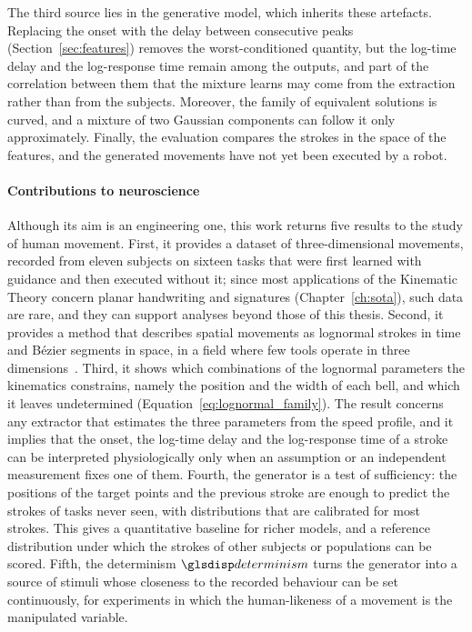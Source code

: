 \documentclass[12pt]{report}
\begin{document}
The third source lies in the generative model, which inherits these artefacts. Replacing the onset with the delay between consecutive peaks (Section~\ref{sec:features}) removes the worst-conditioned quantity, but the log-time delay and the log-response time remain among the outputs, and part of the correlation between them that the mixture learns may come from the extraction rather than from the subjects. Moreover, the family of equivalent solutions is curved, and a mixture of two Gaussian components can follow it only approximately. Finally, the evaluation compares the strokes in the space of the features, and the generated movements have not yet been executed by a robot.

\paragraph{Contributions to neuroscience}
Although its aim is an engineering one, this work returns five results to the study of human movement. First, it provides a dataset of three-dimensional movements, recorded from eleven subjects on sixteen tasks that were first learned with guidance and then executed without it; since most applications of the Kinematic Theory concern planar handwriting and signatures (Chapter~\ref{ch:sota}), such data are rare, and they can support analyses beyond those of this thesis. Second, it provides a method that describes spatial movements as lognormal strokes in time and Bézier segments in space, in a field where few tools operate in three dimensions~\cite{schindler2018,idelog3d}. Third, it shows which combinations of the lognormal parameters the kinematics constrains, namely the position and the width of each bell, and which it leaves undetermined (Equation~\eqref{eq:lognormal_family}). The result concerns any extractor that estimates the three parameters from the speed profile, and it implies that the onset, the log-time delay and the log-response time of a stroke can be interpreted physiologically only when an assumption or an independent measurement fixes one of them. Fourth, the generator is a test of sufficiency: the positions of the target points and the previous stroke are enough to predict the strokes of tasks never seen, with distributions that are calibrated for most strokes. This gives a quantitative baseline for richer models, and a reference distribution under which the strokes of other subjects or populations can be scored. Fifth, the determinism $\sym{determinism}$ turns the generator into a source of stimuli whose closeness to the recorded behaviour can be set continuously, for experiments in which the human-likeness of a movement is the manipulated variable.
\end{document}
